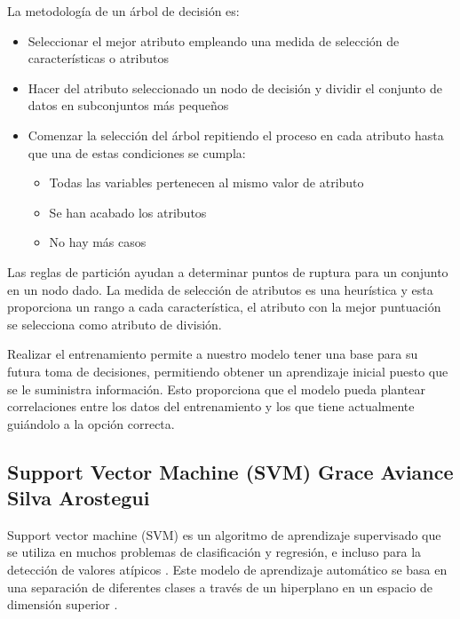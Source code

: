 \documentclass[journal]{IEEEtran}                                                          %
\begin{document}
            La metodología de un árbol de decisión es:
            \begin{itemize}
                \item Seleccionar el mejor atributo empleando una medida de selección de características o atributos
                \item Hacer del atributo seleccionado un nodo de decisión y dividir el conjunto de datos en subconjuntos más pequeños
                \item Comenzar la selección del árbol repitiendo el proceso en cada atributo hasta que una de estas condiciones se cumpla: \begin{itemize}
                    \item Todas las variables pertenecen al mismo valor de atributo
                    \item Se han acabado los atributos
                    \item No hay más casos
                \end{itemize}
            \end{itemize}

            Las reglas de partición ayudan a determinar puntos de ruptura para un conjunto en un nodo dado. La medida de selección de atributos es una heurística y esta proporciona un rango a cada característica, el atributo con la mejor puntuación se selecciona como atributo de división.

            Realizar el entrenamiento permite a nuestro modelo tener una base para su futura toma de decisiones, permitiendo obtener un aprendizaje inicial puesto que se le suministra información. Esto proporciona que el modelo pueda plantear correlaciones entre los datos del entrenamiento y los que tiene actualmente guiándolo a la opción correcta.
        
        \subsection{Support Vector Machine (SVM) Grace Aviance Silva Arostegui} \label{svm}
            
            Support vector machine  (SVM) es un algoritmo de aprendizaje supervisado que se utiliza en muchos problemas de clasificación y regresión, e incluso para la detección de valores atípicos \cite{geron-2019}. Este modelo de aprendizaje automático se basa en una separación de diferentes clases a través de un hiperplano en un espacio de dimensión superior \cite{deisenroth2020mathematics} \cite{mathworks-2022}.
\end{document}
